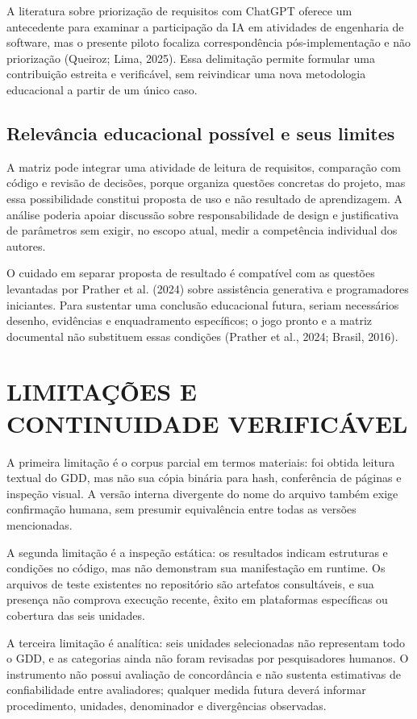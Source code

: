 A literatura sobre priorização de requisitos com ChatGPT oferece um antecedente para examinar a participação da IA em atividades de engenharia de software, mas o presente piloto focaliza correspondência pós-implementação e não priorização (Queiroz; Lima, 2025). Essa delimitação permite formular uma contribuição estreita e verificável, sem reivindicar uma nova metodologia educacional a partir de um único caso.

\subsection{Relevância educacional possível e seus limites}
A matriz pode integrar uma atividade de leitura de requisitos, comparação com código e revisão de decisões, porque organiza questões concretas do projeto, mas essa possibilidade constitui proposta de uso e não resultado de aprendizagem. A análise poderia apoiar discussão sobre responsabilidade de design e justificativa de parâmetros sem exigir, no escopo atual, medir a competência individual dos autores.

O cuidado em separar proposta de resultado é compatível com as questões levantadas por Prather et al. (2024) sobre assistência generativa e programadores iniciantes. Para sustentar uma conclusão educacional futura, seriam necessários desenho, evidências e enquadramento específicos; o jogo pronto e a matriz documental não substituem essas condições (Prather et al., 2024; Brasil, 2016).

\section{LIMITAÇÕES E CONTINUIDADE VERIFICÁVEL}
A primeira limitação é o corpus parcial em termos materiais: foi obtida leitura textual do GDD, mas não sua cópia binária para hash, conferência de páginas e inspeção visual. A versão interna divergente do nome do arquivo também exige confirmação humana, sem presumir equivalência entre todas as versões mencionadas.

A segunda limitação é a inspeção estática: os resultados indicam estruturas e condições no código, mas não demonstram sua manifestação em runtime. Os arquivos de teste existentes no repositório são artefatos consultáveis, e sua presença não comprova execução recente, êxito em plataformas específicas ou cobertura das seis unidades.

A terceira limitação é analítica: seis unidades selecionadas não representam todo o GDD, e as categorias ainda não foram revisadas por pesquisadores humanos. O instrumento não possui avaliação de concordância e não sustenta estimativas de confiabilidade entre avaliadores; qualquer medida futura deverá informar procedimento, unidades, denominador e divergências observadas.

